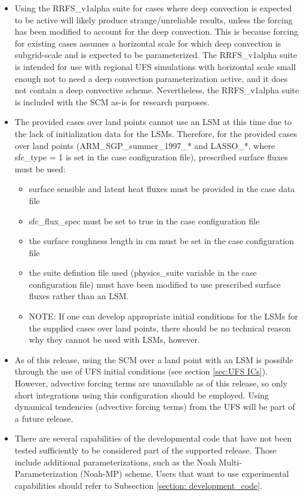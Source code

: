 \begin{itemize}
\item Using the RRFS\_v1alpha suite for cases where deep convection is expected to be active will likely produce strange/unreliable results, unless the forcing has been modified to account for the deep convection. This is because forcing for existing cases assumes a horizontal scale for which deep convection is subgrid-scale and is expected to be parameterized. The RRFS\_v1alpha suite is intended for use with regional UFS simulations with horizontal scale small enough not to need a deep convection parameterization active, and it does not contain a deep convective scheme. Nevertheless, the RRFS\_v1alpha suite is included with the SCM as-is for research purposes.
\item The provided cases over land points cannot use an LSM at this time due to the lack of initialization data for the LSMs. Therefore, for the provided cases over land points (ARM\_SGP\_summer\_1997\_* and LASSO\_*, where sfc\_type = 1 is set in the case configuration file), prescribed surface fluxes must be used:
\begin{itemize}
\item surface sensible and latent heat fluxes must be provided in the case data file
\item sfc\_flux\_spec must be set to true in the case configuration file
\item the surface roughness length in cm must be set in the case configuration file
\item the suite defintion file used (physics\_suite variable in the case configuration file) must have been modified to use prescribed surface fluxes rather than an LSM.
\item NOTE: If one can develop appropriate initial conditions for the LSMs for the supplied cases over land points, there should be no technical reason why they cannot be used with LSMs, however.
\end{itemize}
\item As of this release, using the SCM over a land point with an LSM is possible through the use of UFS initial conditions (see section \ref{sec:UFS ICs}). However, advective forcing terms are unavailable as of this release, so only short integrations using this configuration should be employed. Using dynamical tendencies (advective forcing terms) from the UFS will be part of a future release.
\item There are several capabilities of the developmental code that have not been tested sufficiently to be considered part of the supported release. Those include additional parameterizations, such as the Noah Multi-Parameterization (Noah-MP) scheme. Users that want to use experimental capabilities should refer to Subsection \ref{section: development_code}.
\end{itemize}
